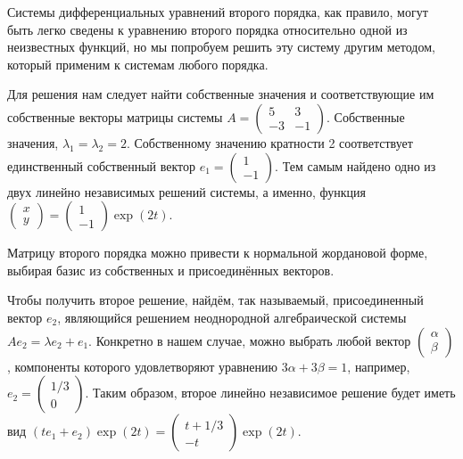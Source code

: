 \begin{solution}
Системы дифференциальных уравнений второго порядка, как правило, могут быть легко сведены к уравнению второго порядка относительно одной из неизвестных функций, но мы попробуем решить эту систему другим методом, который применим к системам любого порядка. 

Для решения нам следует найти собственные значения и соответствующие им собственные векторы матрицы системы $A=\left(\begin{array}{cc} {5} & {3} \\ {-3} & {-1} \end{array}\right)$. Собственные значения, $\lambda _{1} =\lambda _{2} =2$. Собственному значению кратности 2 соответствует единственный собственный вектор $e_{1} =\left(\begin{array}{c} {1} \\ {-1} \end{array}\right)$. Тем самым найдено одно из двух линейно независимых решений системы, а именно, функция $\left(\begin{array}{c} {x} \\ {y} \end{array}\right)=\left(\begin{array}{c} {1} \\ {-1} \end{array}\right)\exp (2t)$. 


Матрицу второго порядка можно привести к нормальной жордановой форме, выбирая базис из собственных и присоединённых векторов.


Чтобы получить второе решение, найдём, так называемый, присоединенный вектор $e_{2} $, являющийся решением неоднородной алгебраической системы $Ae_{2} =\lambda e_{2} +e_{1} $. Конкретно в нашем случае, можно выбрать любой вектор $\left(\begin{array}{c} {\alpha } \\ {\beta } \end{array}\right)$, компоненты которого удовлетворяют уравнению $3\alpha +3\beta =1$, например, $e_{2} =\left(\begin{array}{c} {1/3} \\ {0} \end{array}\right)$. Таким образом, второе линейно независимое решение будет иметь вид $(te_{1} +e_{2} )\exp (2t)=\left(\begin{array}{c} {t+1/3} \\ {-t} \end{array}\right)\exp (2t)$.


\end{solution}
